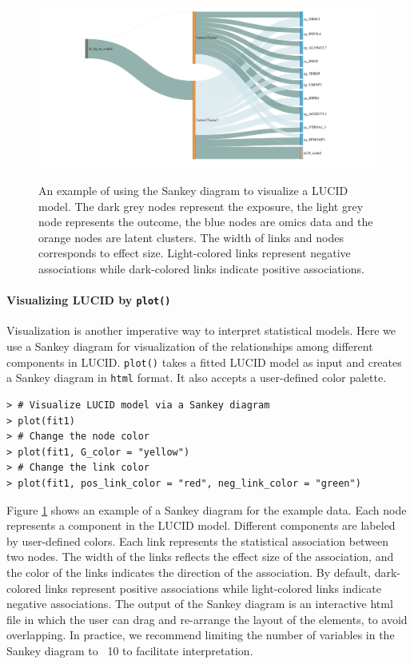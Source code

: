 \begin{figure}

{\centering \includegraphics[width=1\linewidth,alt={graphic without alt text}]{figures/fig3} 

}

\caption{An example of using the Sankey diagram to visualize a LUCID model. The dark grey nodes represent the exposure, the light grey node represents the outcome, the blue nodes are omics data and the orange nodes are latent clusters. The width of links and nodes corresponds to effect size. Light-colored links represent negative associations while dark-colored links indicate positive associations.}\label{fig:fig3}
\end{figure}

\paragraph{\texorpdfstring{Visualizing LUCID by \texttt{plot()}}{Visualizing LUCID by plot()}}\label{sec3.2.2}

Visualization is another imperative way to interpret statistical models.
Here we use a Sankey diagram \citep{schmidt2008sankey} for visualization of
the relationships among different components in LUCID. \texttt{plot()} takes a
fitted LUCID model as input and creates a Sankey diagram in \texttt{html}
format. It also accepts a user-defined color palette.

\begin{verbatim}
> # Visualize LUCID model via a Sankey diagram
> plot(fit1)
> # Change the node color
> plot(fit1, G_color = "yellow")
> # Change the link color
> plot(fit1, pos_link_color = "red", neg_link_color = "green")
\end{verbatim}

Figure \ref{fig:fig3} shows an example of a Sankey diagram for the
example data. Each node represents a component in the LUCID model.
Different components are labeled by user-defined colors. Each link
represents the statistical association between two nodes. The width of
the links reflects the effect size of the association, and the color of
the links indicates the direction of the association. By default,
dark-colored links represent positive associations while light-colored
links indicate negative associations. The output of the Sankey diagram
is an interactive html file in which the user can drag and re-arrange
the layout of the elements, to avoid overlapping. In practice, we
recommend limiting the number of variables in the Sankey diagram to ~10
to facilitate interpretation.


